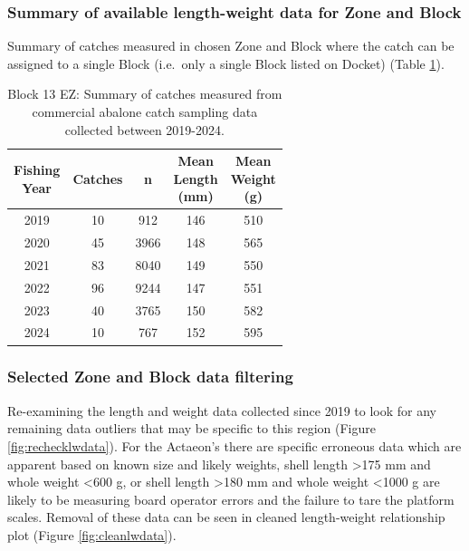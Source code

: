 \documentclass[
]{article}
\begin{document}
\subsubsection{Summary of available length-weight data for Zone and Block}\label{summary-of-available-length-weight-data-for-zone-and-block}

Summary of catches measured in chosen Zone and Block where the catch can be assigned to a single Block (i.e.~only a single Block listed on Docket) (Table \ref{tab:catchsamplesbyblock}).

\begin{table}

\caption{\label{tab:catchsamplesbyblock}Block 13 EZ: Summary of catches measured from commercial abalone catch sampling data collected between 2019-2024.}
\centering
\begin{tabular}[t]{ccccc}
\toprule
\makecell[c]{Fishing\\Year} & Catches & n & \makecell[c]{Mean\\Length\\(mm)} & \makecell[c]{Mean\\Weight\\(g)}\\
\midrule
2019 & 10 & 912 & 146 & 510\\
2020 & 45 & 3966 & 148 & 565\\
2021 & 83 & 8040 & 149 & 550\\
2022 & 96 & 9244 & 147 & 551\\
2023 & 40 & 3765 & 150 & 582\\
2024 & 10 & 767 & 152 & 595\\
\bottomrule
\end{tabular}
\end{table}

\subsubsection{Selected Zone and Block data filtering}\label{selected-zone-and-block-data-filtering}

Re-examining the length and weight data collected since 2019 to look for any remaining data outliers that may be specific to this region (Figure \ref{fig:rechecklwdata}). For the Actaeon's there are specific erroneous data which are apparent based on known size and likely weights, shell length \textgreater175 mm and whole weight \textless600 g, or shell length \textgreater180 mm and whole weight \textless1000 g are likely to be measuring board operator errors and the failure to tare the platform scales. Removal of these data can be seen in cleaned length-weight relationship plot (Figure \ref{fig:cleanlwdata}).
\end{document}
